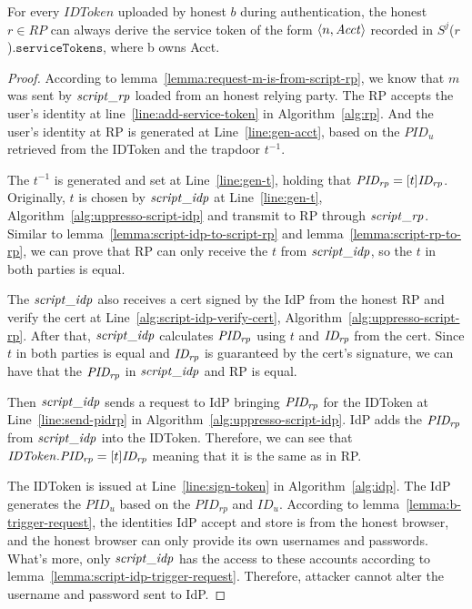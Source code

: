   \begin{lemma}
    For every $IDToken$ uploaded by honest $b$ during authentication, 
    the honest $r \in RP$ can always derive the service token of the form 
    $\langle {{}n, \mathit{Acct}} \rangle$ recorded in $S^j$($r$).$\mathtt{serviceTokens}$, where b owns Acct. 
  \end{lemma}
  \begin{proof}
    According to lemma~\ref{lemma:request-m-is-from-script-rp}, 
    we know that $m$ was sent by $\mathit{script\_rp}$ loaded from an honest relying party. 
    The RP accepts the user's identity at line~\ref{line:add-service-token} in Algorithm~\ref{alg:rp}.
    And the user's identity at RP is generated at Line~\ref{line:gen-acct}, 
    based on the $PID_u$ retrieved from the IDToken and the trapdoor $t^{-1}$. 
    
    The $t^{-1}$ is generated and set at Line~\ref{line:gen-t}, 
    holding that $\mathit{PID_{rp}}=[t]\mathit{ID_{rp}}$.
    Originally, $t$ is chosen by $\mathit{script\_idp}$ at Line~\ref{line:gen-t}, Algorithm~\ref{alg:uppresso-script-idp} 
    and transmit to RP through $\mathit{script\_rp}$.
    Similar to lemma~\ref{lemma:script-idp-to-script-rp} and lemma~\ref{lemma:script-rp-to-rp}, 
    we can prove that RP can only receive the $t$ from $\mathit{script\_idp}$, so the $t$ in both parties is equal.

    The $\mathit{script\_idp}$ also receives a cert signed by the IdP from the honest RP and verify the cert at Line~\ref{alg:script-idp-verify-cert}, Algorithm~\ref{alg:uppresso-script-rp}.
    After that, $\mathit{script\_idp}$ calculates $\mathit{PID_{rp}}$ using $t$ and $\mathit{ID_{rp}}$ from the cert.
    Since $t$ in both parties is equal and $\mathit{ID_{rp}}$ is guaranteed by the cert's signature, 
    we can have that the $\mathit{PID_{rp}}$ in $\mathit{script\_idp}$ and RP is equal.

    Then $\mathit{script\_idp}$ sends a request to IdP bringing $\mathit{PID_{rp}}$ for the IDToken 
    at Line~\ref{line:send-pidrp} in Algorithm~\ref{alg:uppresso-script-idp}.
    IdP adds the $\mathit{PID_{rp}}$ from $\mathit{script\_idp}$ into the IDToken.
    Therefore, we can see that 
    $\mathit{IDToken}.\mathit{PID_{rp}}=[t]\mathit{ID_{rp}}$ meaning that it is the same as in RP.

    The IDToken is issued at Line~\ref{line:sign-token} in Algorithm~\ref{alg:idp}.
    The IdP generates the $PID_u$ based on the $PID_{rp}$ and $ID_u$.
    According to lemma~\ref{lemma:b-trigger-request}, 
    the identities IdP accept and store is from the honest browser, 
    and the honest browser can only provide its own usernames and passwords.
    What's more, only $\mathit{script\_idp}$ has the access to these accounts 
    according to lemma~\ref{lemma:script-idp-trigger-request}.
    Therefore, attacker cannot alter the username and password sent to IdP.
    

\end{proof}
